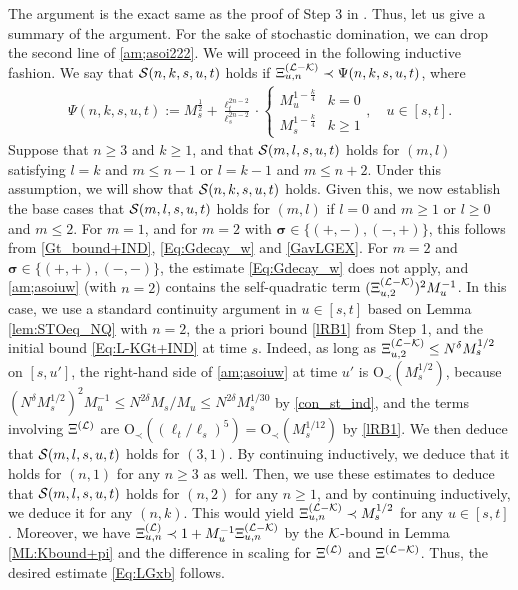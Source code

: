The argument is the exact same as the proof of Step 3 in \cite{YY_25}. Thus, let us give a summary of the argument. For the sake of stochastic domination, we can drop the second line of \eqref{am;asoi222}. We will proceed in the following inductive fashion. We say that ${\cal S}(n,k,s,u,t)$ holds if $\Xi^{({\cal L}-{\cal K})}_{u,n}\prec\Psi(n,k,s,u,t)$, where
%
\begin{align*}
\Psi(n,k,s,u,t):=M_{s}^{\frac12}+\frac{\ell_{t}^{2n-2}}{\ell_{s}^{2n-2}}\cdot\begin{cases}M_{u}^{1-\frac{k}{4}}&k=0\\M_{s}^{1-\frac{k}{4}}&k\geq1\end{cases}, \quad u\in[s,t].
\end{align*}
%
Suppose that $n\geq3$ and $k\geq1$, and that ${\cal S}(m,l,s,u,t)$ holds for $(m,l)$ satisfying $l=k$ and $m\leq n-1$ or $l=k-1$ and $m\leq n+2$. Under this assumption, we will show that ${\cal S}(n,k,s,u,t)$ holds. Given this, we now establish the base cases that ${\cal S}(m,l,s,u,t)$ holds for $(m,l)$ if $l=0$ and $m\geq1$ or $l\geq0$ and $m\leq 2$. For $m=1$, and for $m=2$ with $\boldsymbol{\sigma}\in\{(+,-),(-,+)\}$, this follows from \eqref{Gt_bound+IND}, \eqref{Eq:Gdecay_w} and \eqref{GavLGEX}. For $m=2$ and $\boldsymbol{\sigma}\in\{(+,+),(-,-)\}$, the estimate \eqref{Eq:Gdecay_w} does not apply, and \eqref{am;asoiuw} (with $n=2$) contains the self-quadratic term $(\Xi^{({\cal L}-{\cal K})}_{u,2})^{2}M_{u}^{-1}$. In this case, we use a standard continuity argument in $u\in[s,t]$ based on Lemma \ref{lem:STOeq_NQ} with $n=2$, the a priori bound \eqref{lRB1} from Step 1, and the initial bound \eqref{Eq:L-KGt+IND} at time $s$. Indeed, as long as $\Xi^{({\cal L}-{\cal K})}_{u,2}\leq N^{\delta}M_{s}^{1/2}$ on $[s,u']$, the right-hand side of \eqref{am;asoiuw} at time $u'$ is $\mathrm{O}_{\prec}(M_{s}^{1/2})$, because $(N^{\delta}M_{s}^{1/2})^{2}M_{u}^{-1}\leq N^{2\delta}M_{s}/M_{u}\leq N^{2\delta}M_{s}^{1/30}$ by \eqref{con_st_ind}, and the terms involving $\Xi^{({\cal L})}$ are $\mathrm{O}_{\prec}((\ell_{t}/\ell_{s})^{5})=\mathrm{O}_{\prec}(M_{s}^{1/12})$ by \eqref{lRB1}. We then deduce that ${\cal S}(m,l,s,u,t)$ holds for $(3,1)$. By continuing inductively, we deduce that it holds for $(n,1)$ for any $n\geq3$ as well. Then, we use these estimates to deduce that ${\cal S}(m,l,s,u,t)$ holds for $(n,2)$ for any $n\geq1$, and by continuing inductively, we deduce it for any $(n,k)$. This would yield $\Xi^{({\cal L}-{\cal K})}_{u,n}\prec M_{s}^{1/2}$ for any $u\in[s,t]$. Moreover, we have $\Xi^{({\cal L})}_{u,n}\prec1+M_{u}^{-1}\Xi^{({\cal L}-{\cal K})}_{u,n}$ by the ${\cal K}$-bound in Lemma \ref{ML:Kbound+pi} and the difference in scaling for $\Xi^{({\cal L})}$ and $\Xi^{({\cal L}-{\cal K})}$. Thus, the desired estimate \eqref{Eq:LGxb} follows.


